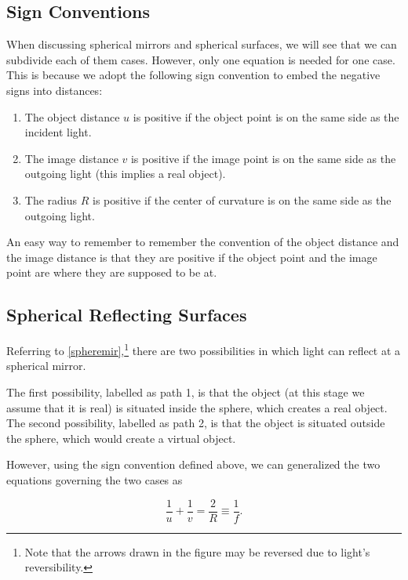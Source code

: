 \documentclass[english,a4paper,12pt]{report}
\begin{document}
\subsection{Sign Conventions}

When discussing spherical mirrors and spherical surfaces, we will see that we can subdivide each of them cases. However, only one equation is needed for one case. This is because we adopt the following sign convention to embed the negative signs into distances:

\begin{enumerate}
    \item The object distance \(u\) is positive if the object point is on the same side as the incident light.
    \item The image distance \(v\) is positive if the image point is on the same side as the outgoing light (this implies a real object).
    \item The radius \(R\) is positive if the center of curvature is on the same side as the outgoing light.
\end{enumerate}

An easy way to remember to remember the convention of the object distance and the image distance is that they are positive if the object point and the image point are where they are supposed to be at.

\subsection{Spherical Reflecting Surfaces} \label{spheremirsec} 

Referring to \cref{spheremir},\footnote{Note that the arrows drawn in the figure may be reversed due to light's reversibility.} there are two possibilities in which light can reflect at a spherical mirror.


The first possibility, labelled as path 1, is that the object (at this stage we assume that it is real) is situated inside the sphere, which creates a real object. The second possibility, labelled as path 2, is that the object is situated outside the sphere, which would create a virtual object.

However, using the sign convention defined above, we can generalized the two equations governing the two cases as 

\begin{equation}
    \frac{1}{u} + \frac{1}{v} = \frac{2}{R} \equiv \frac{1}{f}. \label{mirrorequation} 
\end{equation}
\end{document}
